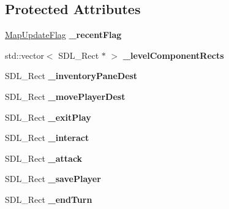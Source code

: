 \subsection*{Protected Attributes}
\begin{DoxyCompactItemize}
\item 
\hypertarget{class_pre_built_level_a4445b1a7c512c2ae4d844844889daa43}{}\label{class_pre_built_level_a4445b1a7c512c2ae4d844844889daa43} 
\hyperlink{namespaces_8h_a8327c0c98430b2c5832c39f0b272c172}{Map\+Update\+Flag} {\bfseries \+\_\+recent\+Flag}
\item 
\hypertarget{class_pre_built_level_a0ad1ddb709d1134c31749bdedda1ec4a}{}\label{class_pre_built_level_a0ad1ddb709d1134c31749bdedda1ec4a} 
std\+::vector$<$ S\+D\+L\+\_\+\+Rect $\ast$ $>$ {\bfseries \+\_\+level\+Component\+Rects}
\item 
\hypertarget{class_pre_built_level_ad20d575f1727d070b27b3baf7a0c4706}{}\label{class_pre_built_level_ad20d575f1727d070b27b3baf7a0c4706} 
S\+D\+L\+\_\+\+Rect {\bfseries \+\_\+inventory\+Pane\+Dest}
\item 
\hypertarget{class_pre_built_level_a812edb421a0f77672e772a7a6e4e0a09}{}\label{class_pre_built_level_a812edb421a0f77672e772a7a6e4e0a09} 
S\+D\+L\+\_\+\+Rect {\bfseries \+\_\+move\+Player\+Dest}
\item 
\hypertarget{class_pre_built_level_a0cbf9d08b7fcba3c500092b71baabdbb}{}\label{class_pre_built_level_a0cbf9d08b7fcba3c500092b71baabdbb} 
S\+D\+L\+\_\+\+Rect {\bfseries \+\_\+exit\+Play}
\item 
\hypertarget{class_pre_built_level_a58bfd4f0b1261029643f832486046ee0}{}\label{class_pre_built_level_a58bfd4f0b1261029643f832486046ee0} 
S\+D\+L\+\_\+\+Rect {\bfseries \+\_\+interact}
\item 
\hypertarget{class_pre_built_level_ab10520b34623c3f2bad2376091a85ebd}{}\label{class_pre_built_level_ab10520b34623c3f2bad2376091a85ebd} 
S\+D\+L\+\_\+\+Rect {\bfseries \+\_\+attack}
\item 
\hypertarget{class_pre_built_level_ac548cf0eb963c29aedf7d930a9828e2f}{}\label{class_pre_built_level_ac548cf0eb963c29aedf7d930a9828e2f} 
S\+D\+L\+\_\+\+Rect {\bfseries \+\_\+save\+Player}
\item 
\hypertarget{class_pre_built_level_a0af43cbd492b80a3aae011426a4e0b87}{}\label{class_pre_built_level_a0af43cbd492b80a3aae011426a4e0b87} 
S\+D\+L\+\_\+\+Rect {\bfseries \+\_\+end\+Turn}
\item 
\hypertarget{class_pre_built_level_affb216fb86f22ae8500621cf45efbacd}{}\label{class_pre_built_level_affb216fb86f22ae8500621cf45efbacd} 

\end{DoxyCompactItemize}
